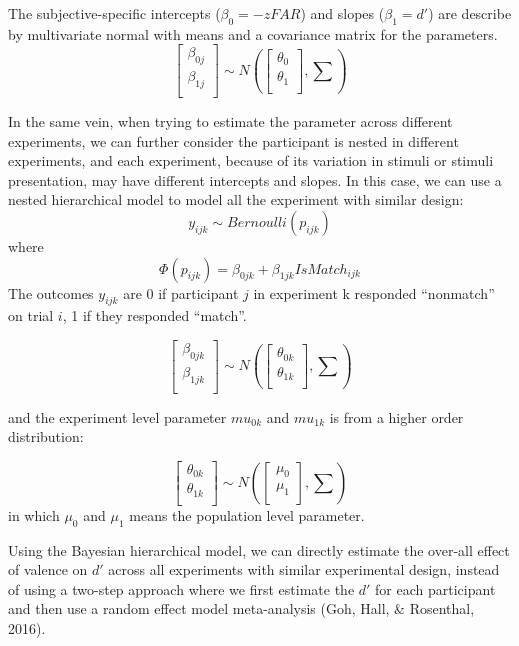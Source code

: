 \documentclass[
  english,
  man]{apa6}
\begin{document}
The subjective-specific intercepts (\(\beta_{0} = -zFAR\)) and slopes (\(\beta_{1} = d'\)) are describe by multivariate normal with means and a covariance matrix for the parameters.
\[ \begin{bmatrix}\beta_{0j}\\
\beta_{1j}\\
\end{bmatrix} \sim N(\begin{bmatrix}\theta_{0}\\
\theta_{1}\\
\end{bmatrix}, \sum) \]

In the same vein, when trying to estimate the parameter across different experiments, we can further consider the participant is nested in different experiments, and each experiment, because of its variation in stimuli or stimuli presentation, may have different intercepts and slopes. In this case, we can use a nested hierarchical model to model all the experiment with similar design:
\[y_{ijk} \sim Bernoulli(p_{ijk})\]
where
\[ \Phi(p_{ijk}) =  \beta_{0jk} + \beta_{1jk}IsMatch_{ijk}\]
The outcomes \(y_{ijk}\) are 0 if participant \(j\) in experiment k responded \enquote{nonmatch} on trial \(i\), 1 if they responded \enquote{match}.

\[\begin{bmatrix}\beta_{0jk}\\
\beta_{1jk}\\
\end{bmatrix} \sim N(\begin{bmatrix}\theta_{0k}\\
\theta_{1k}\\
\end{bmatrix}, \sum)\]

and the experiment level parameter \(mu_{0k}\) and \(mu_{1k}\) is from a higher order distribution:

\[\begin{bmatrix}\theta_{0k}\\
\theta_{1k}\\
\end{bmatrix} \sim N(\begin{bmatrix}\mu_{0}\\
\mu_{1}\\
\end{bmatrix}, \sum)\]
in which \(\mu_{0}\) and \(\mu_{1}\) means the population level parameter.

Using the Bayesian hierarchical model, we can directly estimate the over-all effect of valence on \(d'\) across all experiments with similar experimental design, instead of using a two-step approach where we first estimate the \(d'\) for each participant and then use a random effect model meta-analysis (Goh, Hall, \& Rosenthal, 2016).
\end{document}
